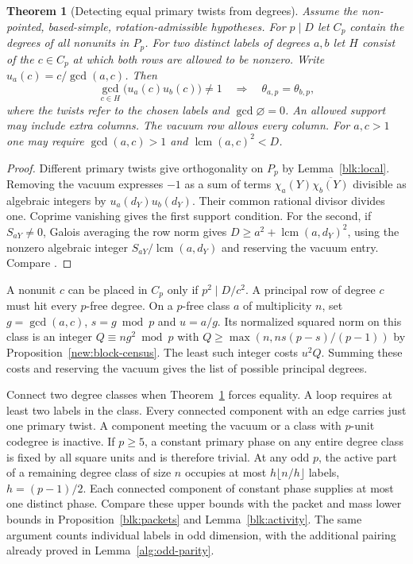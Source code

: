 \documentclass[11pt]{amsart}
\numberwithin{equation}{section}
\newtheorem{theorem}{Theorem}[section]
\theoremstyle{definition}
\theoremstyle{plain}
\DeclareMathOperator{\lcm}{lcm}
\begin{document}
\begin{theorem}[Detecting equal primary twists from degrees]
\label{rev:phase-overlap}
Assume the non-pointed, based-simple, rotation-admissible hypotheses.
For $p\mid D$ let $C_p$ contain the degrees of all nonunits in $P_p$.
For two distinct labels of degrees $a,b$ let $H$ consist of the
$c\in C_p$ at which both rows are allowed to be nonzero. Write
$u_a(c)=c/\gcd(a,c)$. Then
\[
  \gcd_{c\in H}\bigl(u_a(c)u_b(c)\bigr)\ne1
  \quad\Longrightarrow\quad \theta_{a,p}=\theta_{b,p},
\]
where the twists refer to the chosen labels and $\gcd\varnothing=0$.
An allowed support may include extra columns. The vacuum row allows
every column. For $a,c>1$ one may require $\gcd(a,c)>1$ and
$\lcm(a,c)^2<D$.
\end{theorem}
\begin{proof}
Different primary twists give orthogonality on $P_p$ by
Lemma~\ref{blk:local}. Removing the vacuum expresses $-1$ as a sum
of terms $\chi_a(Y)\overline{\chi_b(Y)}$ divisible as algebraic
integers by $u_a(d_Y)u_b(d_Y)$. Their common rational divisor
divides one. Coprime vanishing gives the first support condition.
For the second, if $S_{aY}\ne0$, Galois averaging the row norm
gives $D\ge a^2+\lcm(a,d_Y)^2$, using the nonzero algebraic integer
$S_{aY}/\lcm(a,d_Y)$ and reserving the vacuum entry. Compare
\cite[Theorem~1.1]{DP}.
\end{proof}

A nonunit $c$ can be placed in $C_p$ only if $p^2\mid D/c^2$.
A principal row of degree $c$ must hit every $p$-free degree.
On a $p$-free class $a$ of multiplicity $n$, set $g=\gcd(a,c)$,
$s=g\bmod p$ and $u=a/g$. Its normalized squared norm on this
class is an integer $Q\equiv ng^2\bmod p$ with
$Q\ge\max(n,ns(p-s)/(p-1))$ by Proposition~\ref{new:block-census}.
The least such integer costs $u^2Q$. Summing these costs and reserving
the vacuum gives the list of possible principal degrees.

Connect two degree classes when Theorem~\ref{rev:phase-overlap} forces
equality. A loop requires at least two labels in the class. Every
connected component with an edge carries just one primary twist.
A component meeting the vacuum or a class with $p$-unit codegree
is inactive. If $p\ge5$, a constant primary phase on any entire
degree class is fixed by all square units and is therefore trivial.
At any odd $p$, the active part of a remaining degree class of size
$n$ occupies at most $h\lfloor n/h\rfloor$ labels, $h=(p-1)/2$.
Each connected component of constant phase supplies at most one
distinct phase. Compare these upper bounds with the packet and mass
lower bounds in Proposition~\ref{blk:packets} and
Lemma~\ref{blk:activity}. The same argument counts individual
labels in odd dimension, with the additional pairing already proved
in Lemma~\ref{alg:odd-parity}.
\end{document}
